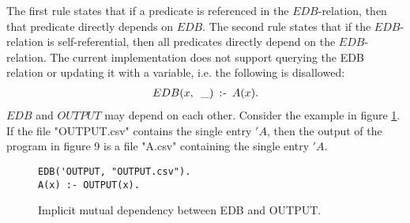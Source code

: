 The first rule states that if a predicate is referenced in the $EDB$-relation, then that predicate directly depends on $EDB$. The second rule states that if the $EDB$-relation is self-referential, then all predicates directly depend on the $EDB$-\hfill
relation. The current implementation does not support querying the EDB relation or updating it with a variable, i.e. the following is disallowed:
\begin{align*}
EDB(x,\;\; \_) \;\mathbin{:\hspace{-0.5ex}\textsf{-}}\; A(x).
\end{align*}
\noindent
$EDB$ and $OUTPUT$ may depend on each other. Consider the example in figure \ref{figure:edboutput}. If the file "OUTPUT.csv" contains the single entry $'A$, then the output of the program in figure 9 is a file "A.csv" containing the single entry $'A$.
\begin{figure}[!ht]
\begin{minipage}{4cm}
\begin{verbatim}
EDB('OUTPUT, "OUTPUT.csv").
A(x) :- OUTPUT(x).
\end{verbatim}
\end{minipage}
\vspace*{-10pt}
\caption{ Implicit mutual dependency between EDB and OUTPUT. }
\label{figure:edboutput}
\end{figure}